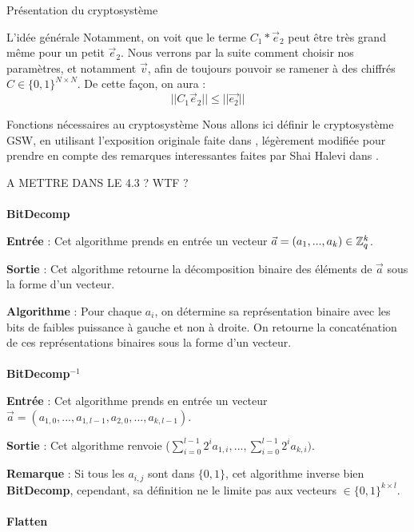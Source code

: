 \begin{section}{Présentation du cryptosystème}
\begin{subsection}{L'idée générale}
	Notamment, on voit que le terme $C_1 * \vec{e}_2$ peut être très grand même pour un petit $\vec{e}_2$. Nous verrons par la suite comment choisir nos paramètres, et notamment $\vec{v}$, afin de toujours pouvoir se ramener à des chiffrés $C \in \{0,1\}^{N \times N}$. De cette façon, on aura :
	\[ ||C_1 \vec{e}_2|| \leqslant ||\vec{e_2}|| \]
	




	\end{subsection}
	\begin{subsection}{Fonctions nécessaires au cryptosystème}
	Nous allons ici définir le cryptosystème GSW, en utilisant l'exposition originale faite dans \cite{EPRINT:GenSahWat13}, légèrement modifiée pour prendre en compte des remarques interessantes faites par Shai Halevi dans \cite{halevi}.

	A METTRE DANS LE 4.3 ? WTF ?
	\paragraph{}
	\textbf{BitDecomp}
	\flushleft

	\textbf{Entrée} : Cet algorithme prends en entrée un vecteur $\vec{a} = (a_1, ..., a_k) \in \mathbb{Z}_q^{k}$.

	\textbf{Sortie} : Cet algorithme retourne la décomposition binaire des éléments de $\vec{a}$ sous la forme d'un vecteur.

	\textbf{Algorithme} : Pour chaque $a_i$, on détermine sa représentation binaire avec les bits de faibles puissance à gauche et non à droite. On retourne la concaténation de ces représentations binaires sous la forme d'un vecteur.
	
	\paragraph{}
	\textbf{BitDecomp}$^{-1}$
	\flushleft

	\textbf{Entrée} : Cet algorithme prends en entrée un vecteur $\vec{a} = (a_{1,0}, ..., a_{1,l-1}, a_{2,0}, ..., a_{k,l-1})$.

	\textbf{Sortie} : Cet algorithme renvoie ($\sum\limits_{i=0}^{l-1} 2^{i} a_{1,i}, ..., \sum\limits_{i=0}^{l-1} 2^{i} a_{k,i})$.

	\textbf{Remarque} : Si tous les $a_{i,j}$ sont dans $\{ 0,1 \} $, cet algorithme inverse bien \textbf{BitDecomp}, cependant, sa définition ne le limite pas aux vecteurs $\in \{ 0,1\} ^{k\times l}$.

	\paragraph{}
	\textbf{Flatten}
	\flushleft


\end{subsection}
\end{section}
